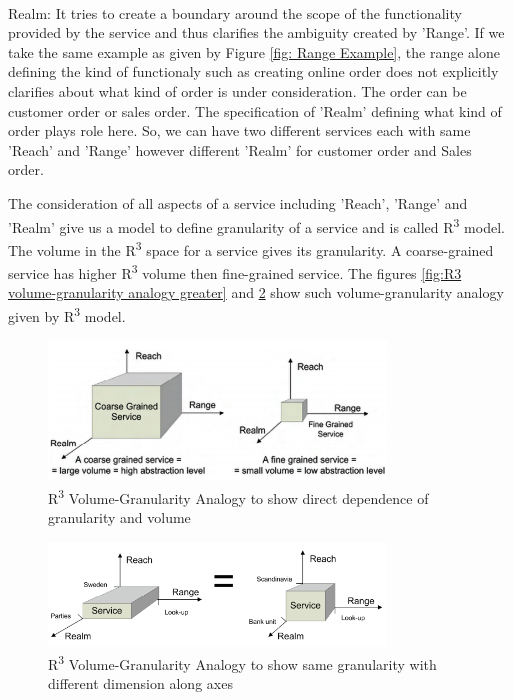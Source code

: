\cite{Keen:2015aa, Weill:1998aa, Pierre-Reldin:2007aa}
\\
Realm: It tries to create a boundary around the scope of the functionality provided by the service and thus clarifies the ambiguity created by 'Range'. If we take the same example as given by Figure \ref{fig: Range Example}, the range alone defining the kind of functionaly such as creating online order does not explicitly clarifies about what kind of order is under consideration. The order can be customer order or sales order. The specification of 'Realm' defining what kind of order plays role here. So, we can have two different services each with same 'Reach' and 'Range' however different 'Realm' for customer order and Sales order.  \cite{Keen:2015aa, Weill:1998aa, Pierre-Reldin:2007aa}

The consideration of all aspects of a service including 'Reach', 'Range' and 'Realm' give us a model to define granularity of a service and is called R\textsuperscript{3} model. The volume in the R\textsuperscript{3} space for a service gives its granularity. A coarse-grained service has higher R\textsuperscript{3} volume then fine-grained service. The figures \ref{fig:R3 volume-granularity analogy greater}  and \ref{fig:R3 volume-granularity analogy equal} show such volume-granularity analogy given by R\textsuperscript{3} model. \cite{Keen:2015aa, Weill:1998aa, Pierre-Reldin:2007aa}

\begin{figure}[H]
\begin{center}
\includegraphics[width=0.8\textwidth]{figures/Granularity-R3-three}
\caption{R\textsuperscript{3} Volume-Granularity Analogy to show direct dependence of granularity and volume \cite{Pierre-Reldin:2007aa}}
\label{fig:R3 volume-granularity analogy greater }
\end{center}
\end{figure}

\begin{figure}[H]
\begin{center}
\includegraphics[width=0.8\textwidth]{figures/Granularity-R3-four}
\caption{R\textsuperscript{3} Volume-Granularity Analogy to show same granularity with different dimension along axes \cite{Pierre-Reldin:2007aa}}
\label{fig:R3 volume-granularity analogy equal}
\end{center}
\end{figure}


